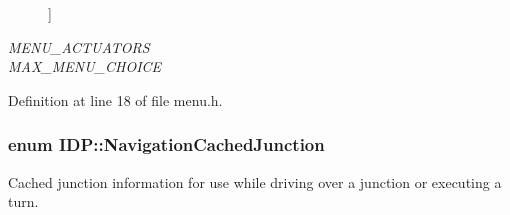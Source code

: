 \begin{Desc}
\begin{description}
{}]\item[{\em 
\hypertarget{namespaceIDP_ac1d3c3b62448912be4da9f2728f2af99af06417b3ca00a4111eca5d60d0ac4c5a}{
MENU\_\-ACTUATORS}
\label{namespaceIDP_ac1d3c3b62448912be4da9f2728f2af99af06417b3ca00a4111eca5d60d0ac4c5a}
}]\item[{\em 
\hypertarget{namespaceIDP_ac1d3c3b62448912be4da9f2728f2af99a01973890c4a02e0650a9043c790228fd}{
MAX\_\-MENU\_\-CHOICE}
\label{namespaceIDP_ac1d3c3b62448912be4da9f2728f2af99a01973890c4a02e0650a9043c790228fd}
}]\end{description}
\end{Desc}



Definition at line 18 of file menu.h.

\hypertarget{namespaceIDP_a628dde0214c4c861deda405e77ad75a2}{
\subsubsection[{NavigationCachedJunction}]{\setlength{\rightskip}{0pt plus 5cm}enum {\bf IDP::NavigationCachedJunction}}}
\label{namespaceIDP_a628dde0214c4c861deda405e77ad75a2}


Cached junction information for use while driving over a junction or executing a turn. 

